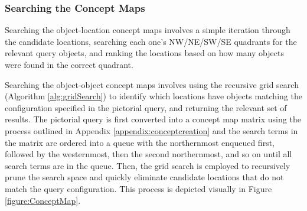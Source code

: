 \subsubsection{Searching the Concept Maps}
Searching the object-location concept maps involves a simple iteration through the candidate locations, searching each one's NW/NE/SW/SE quadrants for the relevant query objects, and ranking the locations based on how many objects were found in the correct quadrant. 

Searching the object-object concept maps involves using the recursive grid search (Algorithm \ref{alg:gridSearch}) to identify which locations have objects matching the configuration specified in the pictorial query, and returning the relevant set of results. 
The pictorial query is first converted into a concept map matrix using the process outlined in Appendix \ref{appendix:conceptcreation} and the search terms in the matrix are ordered into a queue with the northernmost enqueued first, followed by the westernmost, then the second northernmost, and so on until all search terms are in the queue.
Then, the grid search is employed to recursively prune the search space and quickly eliminate candidate locations that do not match the query configuration.
This process is depicted visually in Figure \ref{figure:ConceptMap}.

